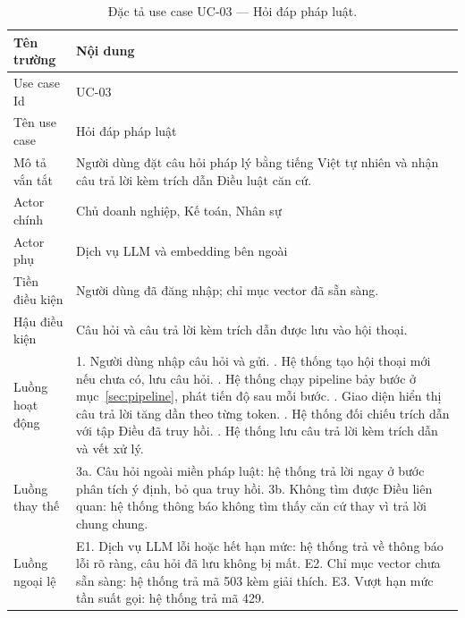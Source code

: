 \documentclass[12pt,a4paper]{report}
\numberwithin{equation}{chapter}
\numberwithin{figure}{chapter}
\numberwithin{table}{chapter}
\begin{document}
\begin{table}[htp]
    \centering
    \caption{Đặc tả use case UC-03 --- Hỏi đáp pháp luật.}
    \label{tab:uc03}
    \begin{tabular}{p{3.4cm}p{10.6cm}}
        \toprule
        \textbf{Tên trường} & \textbf{Nội dung} \\
        \midrule
        Use case Id & UC-03 \\
        Tên use case & Hỏi đáp pháp luật \\
        Mô tả vắn tắt & Người dùng đặt câu hỏi pháp lý bằng tiếng Việt tự nhiên
        và nhận câu trả lời kèm trích dẫn Điều luật căn cứ. \\
        Actor chính & Chủ doanh nghiệp, Kế toán, Nhân sự \\
        Actor phụ & Dịch vụ LLM và embedding bên ngoài \\
        Tiền điều kiện & Người dùng đã đăng nhập; chỉ mục vector đã sẵn sàng. \\
        Hậu điều kiện & Câu hỏi và câu trả lời kèm trích dẫn được lưu vào hội
        thoại. \\
        Luồng hoạt động & 1. Người dùng nhập câu hỏi và gửi. \newline
        2. Hệ thống tạo hội thoại mới nếu chưa có, lưu câu hỏi. \newline
        3. Hệ thống chạy pipeline bảy bước ở mục~\ref{sec:pipeline}, phát tiến độ
        sau mỗi bước. \newline
        4. Giao diện hiển thị câu trả lời tăng dần theo từng token. \newline
        5. Hệ thống đối chiếu trích dẫn với tập Điều đã truy hồi. \newline
        6. Hệ thống lưu câu trả lời kèm trích dẫn và vết xử lý. \\
        Luồng thay thế & 3a. Câu hỏi ngoài miền pháp luật: hệ thống trả lời ngay
        ở bước phân tích ý định, bỏ qua truy hồi. \newline
        3b. Không tìm được Điều liên quan: hệ thống thông báo không tìm thấy căn
        cứ thay vì trả lời chung chung. \\
        Luồng ngoại lệ & E1. Dịch vụ LLM lỗi hoặc hết hạn mức: hệ thống trả về
        thông báo lỗi rõ ràng, câu hỏi đã lưu không bị mất. \newline
        E2. Chỉ mục vector chưa sẵn sàng: hệ thống trả mã 503 kèm giải thích. \newline
        E3. Vượt hạn mức tần suất gọi: hệ thống trả mã 429. \\
        \bottomrule
    \end{tabular}
\end{table}
\end{document}
